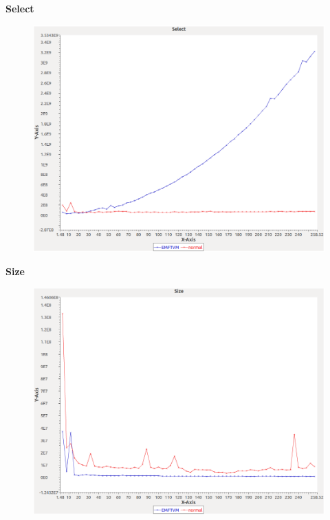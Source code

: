 \noindent\textbf{Select}

\begin{figure}[h]
\centering
\includegraphics[width=\textwidth]{graphs/set/Select}
\end{figure}
\pagebreak

\noindent\textbf{Size}

\begin{figure}[h]
\centering
\includegraphics[width=\textwidth]{graphs/set/Size}
\end{figure}
\pagebreak

